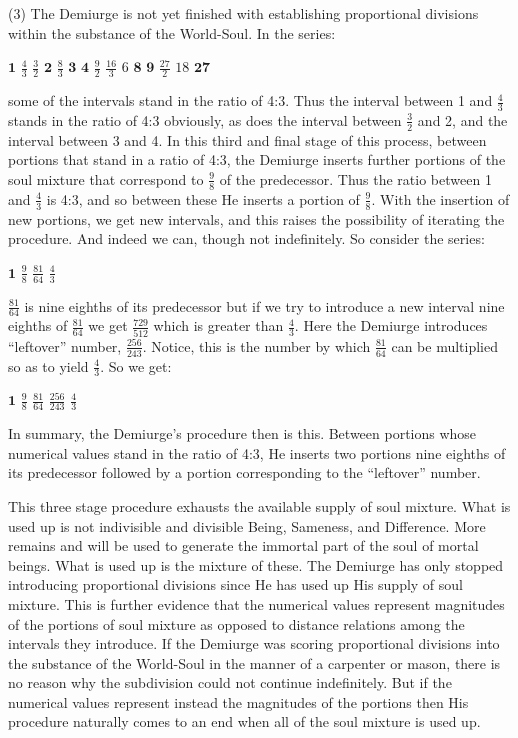 (3) The Demiurge is not yet finished with establishing proportional divisions within the substance of the World-Soul. In the series: 
\begin{center}
	\( \mathbf{1} \) \( \frac{4}{3} \) \( \frac{3}{2} \) \( \mathbf{2} \) \( \frac{8}{3} \) \( \mathbf{3} \) \( \mathbf{4} \) \( \frac{9}{2} \) \( \frac{16}{3} \) \( 6 \) \( \mathbf{8} \) \( \mathbf{9} \) \( \frac{27}{2} \) \( 18 \) \( \mathbf{27} \)
\end{center}
some of the intervals stand in the ratio of 4:3. Thus the interval between 1 and \( \frac{4}{3} \) stands in the ratio of 4:3 obviously, as does the interval between \( \frac{3}{2} \) and 2, and the interval between 3 and 4. In this third and final stage of this process, between portions that stand in a ratio of 4:3, the Demiurge inserts further portions of the soul mixture that correspond to \( \frac{9}{8} \) of the predecessor. Thus the ratio between 1 and \( \frac{4}{3} \) is 4:3, and so between these He inserts a portion of \( \frac{9}{8} \). With the insertion of new portions, we get new intervals, and this raises the possibility of iterating the procedure. And indeed we can, though not indefinitely. So consider the series:
\begin{center}
	\( \mathbf{1} \) \( \frac{9}{8} \) \( \frac{81}{64} \) \( \frac{4}{3} \)
\end{center}
\( \frac{81}{64} \) is nine eighths of its predecessor but if we try to introduce a new interval nine eighths of \( \frac{81}{64} \) we get \( \frac{729}{512} \) which is greater than \( \frac{4}{3} \). Here the Demiurge introduces ``leftover'' number, \( \frac{256}{243} \). Notice, this is the number by which \( \frac{81}{64} \) can be multiplied so as to yield \( \frac{4}{3} \). So we get:
\begin{center}
	\( \mathbf{1} \) \( \frac{9}{8} \) \( \frac{81}{64} \) \( \frac{256}{243} \) \( \frac{4}{3} \)
\end{center}
In summary, the Demiurge's procedure then is this. Between portions whose numerical values stand in the ratio of 4:3, He inserts two portions nine eighths of its predecessor followed by a portion corresponding to the ``leftover'' number.

This three stage procedure exhausts the available supply of soul mixture. What is used up is not indivisible and divisible Being, Sameness, and Difference. More remains and will be used to generate the immortal part of the soul of mortal beings. What is used up is the mixture of these. The Demiurge has only stopped introducing proportional divisions since He has used up His supply of soul mixture. This is further evidence that the numerical values represent magnitudes of the portions of soul mixture as opposed to distance relations among the intervals they introduce. If the Demiurge was scoring proportional divisions into the substance of the World-Soul in the manner of a carpenter or mason, there is no reason why the subdivision could not continue indefinitely. But if the numerical values represent instead the magnitudes of the portions then His procedure naturally comes to an end when all of the soul mixture is used up.

